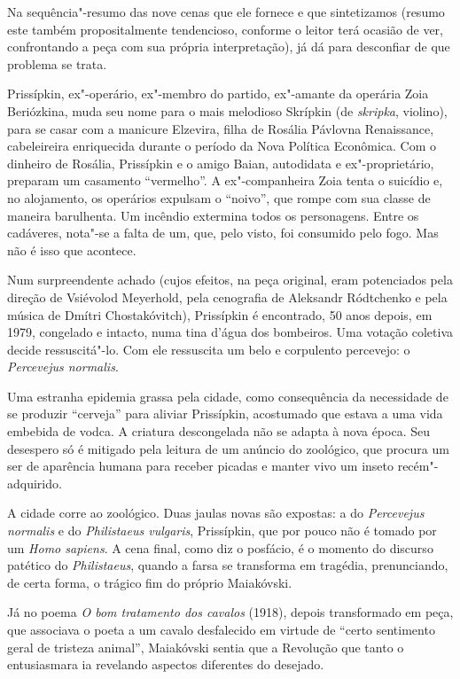 Na sequência"-resumo das nove cenas que ele fornece e que sintetizamos
(resumo este também propositalmente tendencioso, conforme o leitor terá
ocasião de ver, confrontando a peça com sua própria interpretação), já
dá para desconfiar de que problema se trata.

Prissípkin, ex"-operário, ex"-membro do partido, ex"-amante da operária
Zoia Beriózkina, muda seu nome para o mais melodioso Skrípkin (de
\emph{skripka}, violino), para se casar com a manicure Elzevira, filha
de Rosália Pávlovna Renaissance, cabeleireira enriquecida durante o
período da Nova Política Econômica. Com o dinheiro de Rosália,
Prissípkin e o amigo Baian, autodidata e ex"-proprietário, preparam um
casamento ``vermelho''. A ex"-companheira Zoia tenta o suicídio e, no
alojamento, os operários expulsam o ``noivo'', que rompe com sua classe de
maneira barulhenta. Um incêndio extermina todos os personagens. Entre os
cadáveres, nota"-se a falta de um, que, pelo visto, foi consumido pelo
fogo. Mas não é isso que acontece.

Num surpreendente achado (cujos efeitos, na peça original, eram
potenciados pela direção de Vsiévolod Meyerhold, pela cenografia de
Aleksandr Ródtchenko e pela música de Dmítri Chostakóvitch), Prissípkin
é encontrado, 50 anos depois, em 1979, congelado e intacto, numa tina
d'água dos bombeiros. Uma votação coletiva decide ressuscitá"-lo. Com ele
ressuscita um belo e corpulento percevejo: o \emph{Percevejus normalis}.

Uma estranha epidemia grassa pela cidade, como consequência da
necessidade de se produzir ``cerveja'' para aliviar Prissípkin, acostumado
que estava a uma vida embebida de vodca. A criatura descongelada não se
adapta à nova época. Seu desespero só é mitigado pela leitura de um
anúncio do zoológico, que procura um ser de aparência humana para
receber picadas e manter vivo um inseto recém"-adquirido.

A cidade corre ao zoológico. Duas jaulas novas são expostas: a do
\emph{Percevejus normalis} e do \emph{Philistaeus vulgaris},
Prissípkin, que por pouco não é tomado por um \emph{Homo sapiens}. A
cena final, como diz o posfácio, é o momento do discurso patético do
\emph{Philistaeus}, quando a farsa se transforma em tragédia,
prenunciando, de certa forma, o trágico fim do próprio Maiakóvski.

Já no poema \emph{O bom tratamento dos cavalos} (1918), depois
transformado em peça, que associava o poeta a um cavalo desfalecido em
virtude de ``certo sentimento geral de tristeza animal'', Maiakóvski
sentia que a Revolução que tanto o entusiasmara ia revelando aspectos
diferentes do desejado.

